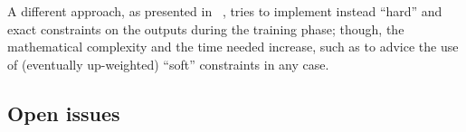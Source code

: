 A different approach, as  presented in ~\cite{salzmann}, tries to implement instead ``hard'' and exact constraints on the outputs during the training  phase; though, the mathematical complexity and the time needed increase, such as to advice the use of (eventually up-weighted)  ``soft'' constraints in any case.


\subsection{Open issues}
